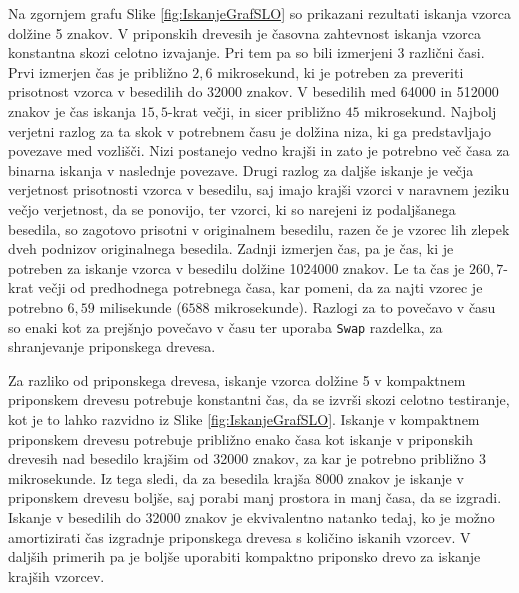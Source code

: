 Na zgornjem grafu Slike \ref{fig:IskanjeGrafSLO} so prikazani rezultati iskanja vzorca dolžine 5 znakov. V priponskih drevesih je časovna zahtevnost iskanja vzorca konstantna skozi celotno izvajanje. Pri tem pa so bili izmerjeni 3 različni časi. Prvi izmerjen čas je približno $2,6$ mikrosekund, ki je potreben za preveriti prisotnost vzorca v besedilih do 32000 znakov. V besedilih med 64000 in 512000 znakov je čas iskanja $15,5$-krat večji, in sicer približno $45$ mikrosekund. Najbolj verjetni razlog za ta skok v potrebnem času je dolžina niza, ki ga predstavljajo povezave med vozlišči. Nizi postanejo vedno krajši in zato je potrebno več časa za binarna iskanja v naslednje povezave. Drugi razlog za daljše iskanje je večja verjetnost prisotnosti vzorca v besedilu, saj imajo krajši vzorci v naravnem jeziku večjo verjetnost, da se ponovijo, ter vzorci, ki so narejeni iz podaljšanega besedila, so zagotovo prisotni v originalnem besedilu, razen če je vzorec lih zlepek dveh podnizov originalnega besedila. Zadnji izmerjen čas, pa je čas, ki je potreben za iskanje vzorca v besedilu dolžine 1024000 znakov. Le ta čas je $260,7$-krat večji od predhodnega potrebnega časa, kar pomeni, da za najti vzorec je potrebno $6,59$ milisekunde ($6588$ mikrosekunde). Razlogi za to povečavo v času so enaki kot za prejšnjo povečavo v času ter uporaba \verb|Swap| razdelka, za shranjevanje priponskega drevesa.

Za razliko od priponskega drevesa, iskanje vzorca dolžine 5 v kompaktnem priponskem drevesu potrebuje konstantni čas, da se izvrši skozi celotno testiranje, kot je to lahko razvidno iz Slike \ref{fig:IskanjeGrafSLO}. Iskanje v kompaktnem priponskem drevesu potrebuje približno enako časa kot iskanje v priponskih drevesih nad besedilo krajšim od 32000 znakov, za kar je potrebno približno $3$ mikrosekunde. Iz tega sledi, da za besedila krajša 8000 znakov je iskanje v priponskem drevesu boljše, saj porabi manj prostora in manj časa, da se izgradi. Iskanje v besedilih do 32000 znakov je ekvivalentno natanko tedaj, ko je možno amortizirati čas izgradnje priponskega drevesa s količino iskanih vzorcev. V daljših primerih pa je boljše uporabiti kompaktno priponsko drevo za iskanje krajših vzorcev.

